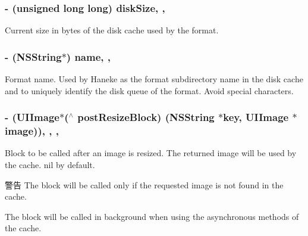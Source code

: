 \subsubsection[{disk\+Size}]{\setlength{\rightskip}{0pt plus 5cm}-\/ (unsigned long long) disk\+Size\hspace{0.3cm}{\ttfamily [read]}, {\ttfamily [nonatomic]}, {\ttfamily [assign]}}\label{interface_h_n_k_cache_format_aeeea00feba542e026e941c74ec94e432}
Current size in bytes of the disk cache used by the format. \hypertarget{interface_h_n_k_cache_format_a2cabd5d85fdedcf7adc29d03e4fd8c41}{}
\subsubsection[{name}]{\setlength{\rightskip}{0pt plus 5cm}-\/ (N\+S\+String$\ast$) name\hspace{0.3cm}{\ttfamily [read]}, {\ttfamily [nonatomic]}, {\ttfamily [assign]}}\label{interface_h_n_k_cache_format_a2cabd5d85fdedcf7adc29d03e4fd8c41}
Format name. Used by Haneke as the format subdirectory name in the disk cache and to uniquely identify the disk queue of the format. Avoid special characters. \hypertarget{interface_h_n_k_cache_format_aa45b853ab58054e92b3234c6d00e5f91}{}
\subsubsection[{post\+Resize\+Block}]{\setlength{\rightskip}{0pt plus 5cm}-\/ (U\+I\+Image$\ast$($^\wedge$ post\+Resize\+Block) (N\+S\+String $\ast$key, U\+I\+Image $\ast$image))\hspace{0.3cm}{\ttfamily [read]}, {\ttfamily [write]}, {\ttfamily [nonatomic]}, {\ttfamily [copy]}}\label{interface_h_n_k_cache_format_aa45b853ab58054e92b3234c6d00e5f91}
Block to be called after an image is resized. The returned image will be used by the cache. nil by default. \begin{DoxyWarning}{警告}
The block will be called only if the requested image is not found in the cache. 

The block will be called in background when using the asynchronous methods of the cache. 
\end{DoxyWarning}
\hypertarget{interface_h_n_k_cache_format_a8cf73fa8bf0b16d18bf3040ba05432ce}{}
